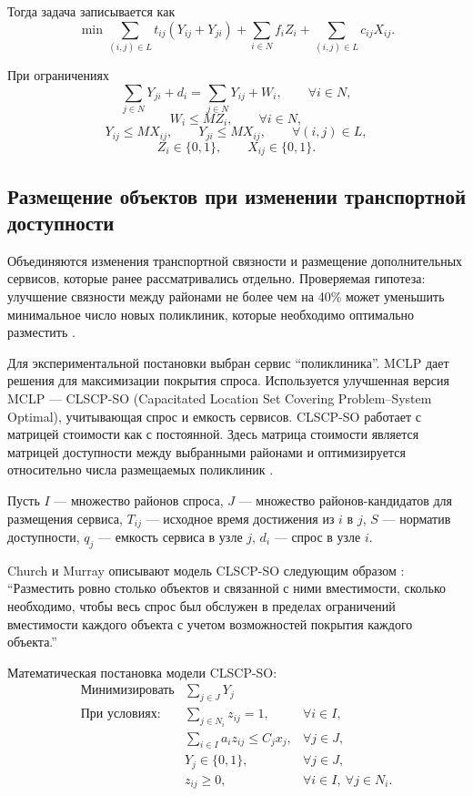 Тогда задача записывается как
\[
\min
\sum_{(i,j)\in L} t_{ij}(Y_{ij}+Y_{ji})
+ \sum_{i\in N} f_i Z_i
+ \sum_{(i,j)\in L} c_{ij} X_{ij}.
\]

При ограничениях
\[
\sum_{j\in N} Y_{ji} + d_i
=
\sum_{j\in N} Y_{ij} + W_i,
\qquad \forall i\in N,
\]
\[
W_i \le M Z_i,
\qquad \forall i\in N,
\]
\[
Y_{ij} \le M X_{ij}, \qquad
Y_{ji} \le M X_{ij},
\qquad \forall (i,j)\in L,
\]
\[
Z_i \in \{0,1\}, \qquad
X_{ij} \in \{0,1\}.
\]

\subsection{Размещение объектов при изменении транспортной доступности}
\label{subsec:chapter3-tikhevich}

Объединяются изменения транспортной связности и размещение дополнительных сервисов, которые ранее рассматривались отдельно. Проверяемая гипотеза: улучшение связности между районами не более чем на 40\% может уменьшить минимальное число новых поликлиник, которые необходимо оптимально разместить \cite{kontsevik2024connectivityPlacement}.

Для экспериментальной постановки выбран сервис ``поликлиника''. MCLP дает решения для максимизации покрытия спроса. Используется улучшенная версия MCLP --- CLSCP-SO (Capacitated Location Set Covering Problem--System Optimal), учитывающая спрос и емкость сервисов. CLSCP-SO работает с матрицей стоимости как с постоянной. Здесь матрица стоимости является матрицей доступности между выбранными районами и оптимизируется относительно числа размещаемых поликлиник \cite{churchMurray2018,spoptLscpCapacity,kontsevik2024connectivityPlacement}.

Пусть
$I$ --- множество районов спроса,
$J$ --- множество районов-кандидатов для размещения сервиса,
$T_{ij}$ --- исходное время достижения из $i$ в $j$,
$S$ --- норматив доступности,
$q_j$ --- емкость сервиса в узле $j$,
$d_i$ --- спрос в узле $i$.

Church и Murray описывают модель CLSCP-SO следующим образом \cite{churchMurray2018}:
``Разместить ровно столько объектов и связанной с ними вместимости, сколько необходимо, чтобы весь спрос был обслужен в пределах ограничений вместимости каждого объекта с учетом возможностей покрытия каждого объекта.''

Математическая постановка модели CLSCP-SO:
\[
\begin{array}{rll}
\textbf{Минимизировать}
& \displaystyle \sum_{j\in J} Y_j
& \\[0.4em]
\textbf{При условиях:}
& \displaystyle \sum_{j\in N_i} z_{ij} = 1,
& \forall i\in I, \\[0.8em]
& \displaystyle \sum_{i\in I} a_i z_{ij} \le C_j x_j,
& \forall j\in J, \\[0.8em]
& Y_j \in \{0,1\},
& \forall j\in J, \\[0.4em]
& z_{ij} \ge 0,
& \forall i\in I,\ \forall j\in N_i .
\end{array}
\]

